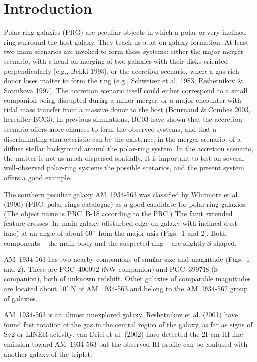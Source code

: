 \documentclass[]{aa}
\begin{document}
\maketitle
\section{Introduction}

Polar-ring galaxies (PRG) are peculiar objects in which a polar or 
very inclined ring surround the host galaxy. They teach us a lot on 
galaxy formation. At least two main scenarios are invoked to form 
these systems: either the major merger scenario, with a head-on 
merging of two galaxies with their disks oriented perpendicularly 
(e.g., Bekki 1998), or the accretion scenario, where a gas-rich 
donor loses matter to form the ring (e.g., Schweizer et al. 1983, 
Reshetnikov \& Sotnikova 1997). The accretion scenario itself could 
either correspond to a small companion being disrupted during a minor 
merger, or a major encounter with tidal mass transfer from a massive 
donor to the host (Bournaud \& Combes 2003, hereafter BC03). In 
previous simulations, BC03 have shown that the accretion scenario 
offers more chances to form the observed systems, and that a 
discriminating characteristic can be the existence, in the merger scenario, 
of a diffuse stellar background around the polar-ring system. In the accretion 
scenario, the matter is not as much dispersed spatially. It is important to 
test on several well-observed polar-ring systems the possible scenarios, and 
the present system offers a good example.
 
The southern peculiar galaxy AM~1934-563 was classified by
Whitmore et al. (1990) (PRC, polar rings catalogue) as a good candidate 
for polar-ring galaxies. (The object name is PRC~B-18 according to the PRC.)
The faint extended feature crosses the main galaxy (disturbed
edge-on galaxy with inclined dust lane) at an angle of about
60$^{\rm o}$ from the major axis (Figs.~1 and 2). Both components --
the main body and the suspected ring -- are slightly S-shaped.

AM~1934-563 has two nearby companions of similar size and
magnitude (Figs.~1 and 2). These are PGC~400092 (NW companion) 
and PGC~399718 (S companion), both of unknown redshift.   
Other galaxies of comparable magnitudes are located about
10$'$ N of AM~1934-563 and belong to the AM~1934-562 group
of galaxies. 

AM~1934-563 is an almost unexplored galaxy. Reshetnikov et al. (2001)
have found fast rotation of the gas in the central region of
the galaxy, as far as signs of Sy2 or LINER activity. 
van Driel et al. (2002) have detected the 21-cm HI line emission
toward AM~1934-563 but the observed HI profile can be confused
with another galaxy of the triplet. 
\end{document}
